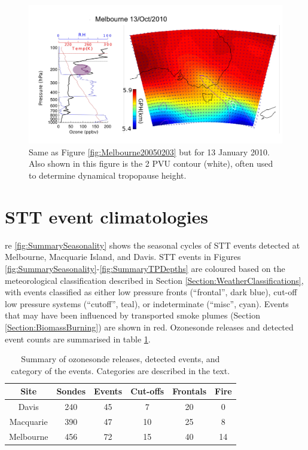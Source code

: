\documentclass{article}
\begin{document}
    \begin{figure}[!htbp]
      \begin{center}
      \includegraphics[width=1.0\columnwidth]{figures/Melbourne20100113.png}
      \caption{Same as Figure \ref{fig:Melbourne20050203} but for 13 January 2010.
	Also shown in this figure is the 2 PVU contour (white), often used to determine dynamical tropopause height.}
      \label{fig:Melbourne20100113}
      \end{center}
    \end{figure}

\section{STT event climatologies}
  \label{sec:eventclimatologies}
  re \ref{fig:SummarySeasonality} shows the seasonal cycles of STT events detected at Melbourne, Macquarie Island, and Davis. 
  STT events in Figures \ref{fig:SummarySeasonality}-\ref{fig:SummaryTPDepths} are coloured based on the meteorological classification described in Section \ref{Section:WeatherClassifications}, with events classified as either low pressure fronts (“frontal”, dark blue), cut-off low pressure systems (“cutoff”, teal), or indeterminate (“misc”, cyan).
  Events that may have been influenced by transported smoke plumes (Section \ref{Section:BiomassBurning}) are shown in red.
  Ozonesonde releases and detected event counts are summarised in table \ref{table:EventCounts}.
  \begin{table}[htbp!]
    \centering
    \begin{tabular}{| c | c | c | c | c | c |} 
      \hline
      Site & Sondes & Events & Cut-offs & Frontals & Fire \\
      \hline
      Davis     & 240 & 45 & 7  & 20 & 0 \\ 
      Macquarie & 390 & 47 & 10 & 25 & 8 \\
      Melbourne & 456 & 72 & 15 & 40 & 14 \\
      \hline
    \end{tabular}
    \caption{Summary of ozonesonde releases, detected events, and category of the events.
      Categories are described in the text.}
    \label{table:EventCounts}
  \end{table}
  
\end{document}
